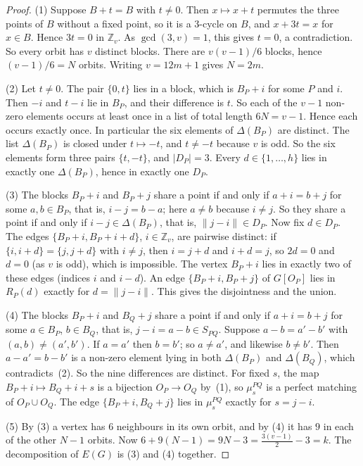 \documentclass[11pt]{amsart}
\theoremstyle{plain}
\theoremstyle{definition}
\theoremstyle{remark}
\numberwithin{equation}{section}
\newcommand{\Z}{\mathbb{Z}}
\newcommand{\nrm}[1]{\lVert #1\rVert}
\newcommand{\abs}[1]{\lvert #1\rvert}
\begin{document}
\begin{proof}
(1) Suppose \(B+t=B\) with \(t\ne0\). Then \(x\mapsto x+t\) permutes the three points of \(B\) without a fixed point, so it is a \(3\)-cycle on \(B\), and \(x+3t=x\) for \(x\in B\). Hence \(3t=0\) in \(\Z_v\). As \(\gcd(3,v)=1\), this gives \(t=0\), a contradiction. So every orbit has \(v\) distinct blocks. There are \(v(v-1)/6\) blocks, hence \((v-1)/6=N\) orbits. Writing \(v=12m+1\) gives \(N=2m\).

(2) Let \(t\ne0\). The pair \(\{0,t\}\) lies in a block, which is \(B_P+i\) for some \(P\) and \(i\). Then \(-i\) and \(t-i\) lie in \(B_P\), and their difference is \(t\). So each of the \(v-1\) non-zero elements occurs at least once in a list of total length \(6N=v-1\). Hence each occurs exactly once. In particular the six elements of \(\Delta(B_P)\) are distinct. The list \(\Delta(B_P)\) is closed under \(t\mapsto -t\), and \(t\ne -t\) because \(v\) is odd. So the six elements form three pairs \(\{t,-t\}\), and \(\abs{D_P}=3\). Every \(d\in\{1,\dots,h\}\) lies in exactly one \(\Delta(B_P)\), hence in exactly one \(D_P\).

(3) The blocks \(B_P+i\) and \(B_P+j\) share a point if and only if \(a+i=b+j\) for some \(a,b\in B_P\), that is, \(i-j=b-a\); here \(a\ne b\) because \(i\ne j\). So they share a point if and only if \(i-j\in\Delta(B_P)\), that is, \(\nrm{j-i}\in D_P\). Now fix \(d\in D_P\). The edges \(\{B_P+i,B_P+i+d\}\), \(i\in\Z_v\), are pairwise distinct: if \(\{i,i+d\}=\{j,j+d\}\) with \(i\ne j\), then \(i=j+d\) and \(i+d=j\), so \(2d=0\) and \(d=0\) (as \(v\) is odd), which is impossible. The vertex \(B_P+i\) lies in exactly two of these edges (indices \(i\) and \(i-d\)). An edge \(\{B_P+i,B_P+j\}\) of \(G[O_P]\) lies in \(R_P(d)\) exactly for \(d=\nrm{j-i}\). This gives the disjointness and the union.

(4) The blocks \(B_P+i\) and \(B_Q+j\) share a point if and only if \(a+i=b+j\) for some \(a\in B_P\), \(b\in B_Q\), that is, \(j-i=a-b\in S_{PQ}\). Suppose \(a-b=a'-b'\) with \((a,b)\ne(a',b')\). If \(a=a'\) then \(b=b'\); so \(a\ne a'\), and likewise \(b\ne b'\). Then \(a-a'=b-b'\) is a non-zero element lying in both \(\Delta(B_P)\) and \(\Delta(B_Q)\), which contradicts~(2). So the nine differences are distinct. For fixed \(s\), the map \(B_P+i\mapsto B_Q+i+s\) is a bijection \(O_P\to O_Q\) by~(1), so \(\mu^{PQ}_s\) is a perfect matching of \(O_P\cup O_Q\). The edge \(\{B_P+i,B_Q+j\}\) lies in \(\mu^{PQ}_s\) exactly for \(s=j-i\).

(5) By (3) a vertex has \(6\) neighbours in its own orbit, and by (4) it has \(9\) in each of the other \(N-1\) orbits. Now \(6+9(N-1)=9N-3=\tfrac{3(v-1)}{2}-3=k\). The decomposition of \(E(G)\) is (3) and (4) together.
\end{proof}
\end{document}
